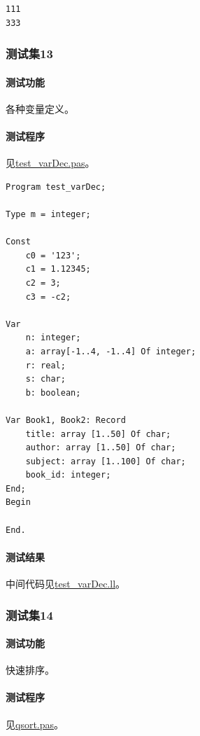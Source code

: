 \documentclass[lang=cn,11pt,a4paper,cite=authornum]{paper}
\begin{document}
\begin{code}
\begin{verbatim}
111
333
\end{verbatim}
\end{code}

\subsubsection{测试集13}

\paragraph{测试功能} 各种变量定义。

\paragraph{测试程序} 见\href{run:../test/test_varDec.pas}{test\_varDec.pas}。

\begin{code}
\begin{verbatim}
Program test_varDec;

Type m = integer;

Const 
    c0 = '123';
    c1 = 1.12345;
    c2 = 3;
    c3 = -c2;

Var 
    n: integer;
    a: array[-1..4, -1..4] Of integer;
    r: real;
    s: char;
    b: boolean;

Var Book1, Book2: Record
    title: array [1..50] Of char;
    author: array [1..50] Of char;
    subject: array [1..100] Of char;
    book_id: integer;
End;
Begin

End.
\end{verbatim}
\end{code}

\paragraph{测试结果} 中间代码见\href{run:../test/test_varDec.ll}{test\_varDec.ll}。

\subsubsection{测试集14}

\paragraph{测试功能} 快速排序。

\paragraph{测试程序} 见\href{run:../test/qsort.pas}{qsort.pas}。
\end{document}
